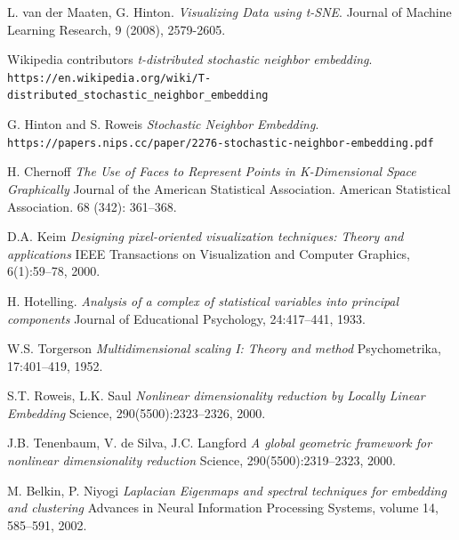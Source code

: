 \newpage
\begin{thebibliography}{6}
	L. van der Maaten, G. Hinton.
	\textit{Visualizing Data using t-SNE}. 
	Journal of Machine Learning Research, 9 (2008), 2579-2605.
	
	Wikipedia contributors
	\textit{t-distributed stochastic neighbor embedding}. 
	\texttt{https://en.wikipedia.org/wiki/T-distributed\_stochastic\_neighbor\_embedding}
	
	G. Hinton and S. Roweis
	\textit{Stochastic Neighbor Embedding}.
	\texttt{https://papers.nips.cc/paper/2276-stochastic-neighbor-embedding.pdf}
	
	H. Chernoff
	\textit{The Use of Faces to Represent Points in K-Dimensional Space Graphically}
	Journal of the American Statistical Association. American Statistical Association. 68 (342): 361–368.

	D.A. Keim
	\textit{Designing pixel-oriented visualization techniques: Theory and applications}
	IEEE Transactions on Visualization and Computer Graphics, 6(1):59–78, 2000.

	H. Hotelling.
	\textit{Analysis of a complex of statistical variables into principal components}
	Journal of Educational Psychology, 24:417–441, 1933.

	W.S. Torgerson
	\textit{Multidimensional scaling I: Theory and method}
	Psychometrika, 17:401–419, 1952.

	S.T. Roweis, L.K. Saul
	\textit{Nonlinear dimensionality reduction by Locally Linear Embedding}
	Science, 290(5500):2323–2326, 2000.

	J.B. Tenenbaum, V. de Silva, J.C. Langford
	\textit{A global geometric framework for nonlinear dimensionality reduction}
	Science, 290(5500):2319–2323, 2000.

	M. Belkin, P. Niyogi
	\textit{Laplacian Eigenmaps and spectral techniques for embedding and clustering}
	Advances in Neural Information Processing Systems, volume 14, 585–591, 2002.

\end{thebibliography}



